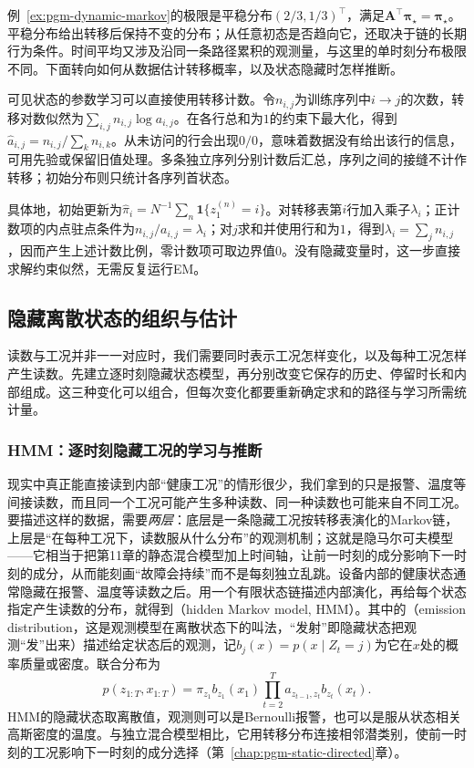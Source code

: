 例~\ref{ex:pgm-dynamic-markov}的极限是平稳分布$(2/3,1/3)^\top$，满足$\bm A^\top\bm\pi_\star=\bm\pi_\star$。平稳分布给出转移后保持不变的分布；从任意初态是否趋向它，还取决于链的长期行为条件。时间平均又涉及沿同一条路径累积的观测量，与这里的单时刻分布极限不同。下面转向如何从数据估计转移概率，以及状态隐藏时怎样推断。

可见状态的参数学习可以直接使用转移计数。令$n_{i,j}$为训练序列中$i\to j$的次数，转移对数似然为$\sum_{i,j}n_{i,j}\log a_{i,j}$。在各行总和为$1$的约束下最大化，得到$\widehat a_{i,j}=n_{i,j}/\sum_k n_{i,k}$。从未访问的行会出现$0/0$，意味着数据没有给出该行的信息，可用先验或保留旧值处理。多条独立序列分别计数后汇总，序列之间的接缝不计作转移；初始分布则只统计各序列首状态。

具体地，初始更新为$\widehat\pi_i=N^{-1}\sum_n\mathbf1\{z^{(n)}_1=i\}$。对转移表第$i$行加入乘子$\lambda_i$；正计数项的内点驻点条件为$n_{i,j}/a_{i,j}=\lambda_i$；对$j$求和并使用行和为$1$，得到$\lambda_i=\sum_jn_{i,j}$，因而产生上述计数比例，零计数项可取边界值$0$。没有隐藏变量时，这一步直接求解约束似然，无需反复运行EM。

\subsection{隐藏离散状态的组织与估计}
\label{sec:pgm-dynamic-hidden-discrete}

读数与工况并非一一对应时，我们需要同时表示工况怎样变化，以及每种工况怎样产生读数。先建立逐时刻隐藏状态模型，再分别改变它保存的历史、停留时长和内部组成。这三种变化可以组合，但每次变化都要重新确定求和的路径与学习所需统计量。

\subsubsection{HMM：逐时刻隐藏工况的学习与推断}
\label{sec:pgm-dynamic-hmm-model}

现实中真正能直接读到内部“健康工况”的情形很少，我们拿到的只是报警、温度等间接读数，而且同一个工况可能产生多种读数、同一种读数也可能来自不同工况。要描述这样的数据，需要\emph{两层}：底层是一条隐藏工况按转移表演化的Markov链，上层是“在每种工况下，读数服从什么分布”的观测机制；这就是隐马尔可夫模型——它相当于把第11章的静态混合模型加上时间轴，让前一时刻的成分影响下一时刻的成分，从而能刻画“故障会持续”而不是每刻独立乱跳。设备内部的健康状态通常隐藏在报警、温度等读数之后。用一个有限状态链描述内部演化，再给每个状态指定产生读数的分布，就得到（hidden Markov model, HMM）。其中的（emission distribution，这是观测模型在离散状态下的叫法，“发射”即隐藏状态把观测“发”出来）描述给定状态后的观测，记$b_j(x)=p(x\mid Z_t=j)$为它在$x$处的概率质量或密度。联合分布为
\begin{equation}
  p(z_{1:T},x_{1:T})
    =\pi_{z_1}b_{z_1}(x_1)
      \prod_{t=2}^{T}a_{z_{t-1},z_t}b_{z_t}(x_t).
  \label{eq:pgm-dynamic-hmm}
\end{equation}
HMM的隐藏状态取离散值，观测则可以是Bernoulli报警，也可以是服从状态相关高斯密度的温度。与独立混合模型相比，它用转移分布连接相邻潜类别，使前一时刻的工况影响下一时刻的成分选择（第~\ref{chap:pgm-static-directed}章）。

